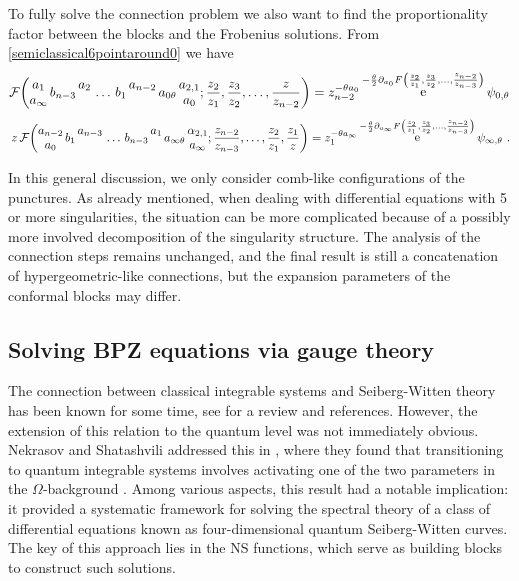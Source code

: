 \documentclass[11pt]{article}
\numberwithin{equation}{section}
\newcommand{\be}{\begin{equation}}
\newcommand{\ee}{\end{equation}}
\DeclareMathOperator{\re}{{\rm e}}
\newcommand{\Fns}[8]{\mathcal{F}\bigg( \begin{matrix} #2 \\ #1 \end{matrix} \, #3 \, \begin{matrix} #4  \\ \, \end{matrix} \,#5 \, #6\,\begin{matrix} #7 \\  \, \end{matrix} \, #8 \, }
\begin{document}
To fully solve the connection problem we also want to find the proportionality factor between the blocks and the Frobenius solutions. From \eqref{semiclassical6pointaround0} we have 
 \be  \Fns{a_{\infty}}{a_{{1}}}{b_{n-3}}{a_{{2}}}{\dots}{b_1}{a_{n-2}}{a_{0\theta}}\begin{matrix} a_{2,1} \\ a_0\end{matrix};\frac{z_{2}}{z_{1}},\frac{z_{3}}{z_{2}},\dots,\frac{z}{z_{n-2}}\bigg) = z_{n-2}^{-\theta a_0}\re^{-{\theta\over 2} \partial_{a_0} F\left(\frac{z_{2}}{z_{1}},\frac{z_{3}}{z_{2}},\dots,\frac{z_{n-2}}{z_{n-3}}\right)}\psi_{0,\theta}
%
\ee
\be \,z\,\Fns{a_{0}}{a_{n-2}}{b_{1}}{a_{{n-3}}}{\dots}{b_{n-3}}{a_{{1}}}{a_{\infty\theta}}\begin{matrix} \alpha_{2,1} \\ a_{\infty}\end{matrix};\frac{z_{n-2}}{z_{n-3}},\dots,\frac{z_{2}}{z_1},\frac{z_{1}}{z}\bigg) =z_{1}^{-\theta a_{\infty}}\re^{-{\theta\over 2} \partial_{a_{\infty}} F\left(\frac{z_{2}}{z_{1}},\frac{z_{3}}{z_{2}},\dots,\frac{z_{n-2}}{z_{n-3}}\right)} \psi_{\infty,\theta}~.\ee
%

In this general discussion, we only consider comb-like  configurations of the punctures. As already mentioned, when dealing with differential equations with 5 or more singularities, the situation can be more complicated because of a possibly more involved decomposition of the singularity structure. The analysis of the connection steps remains unchanged, and the final result is still a concatenation of hypergeometric-like connections, but the expansion parameters of the conformal blocks may differ.
%

\subsection{Solving BPZ equations via gauge theory}\label{sec:gauge}

The connection between classical integrable systems and Seiberg-Witten theory has been known for some time, see \cite{Mbook} for a review and references. However, the extension of this relation to the quantum level was not immediately obvious. Nekrasov and Shatashvili addressed this in \cite{ns}, where they found that transitioning to quantum integrable systems involves activating one of the two parameters in the $\Omega$-background \cite{Moore:1997dj,Lossev:1997bz,no2}. Among various aspects,  this result had a notable implication: it provided a systematic framework for solving the spectral theory of a class of differential equations known as four-dimensional quantum Seiberg-Witten curves. The key of this approach lies in the NS functions, which serve as  building blocks to construct such solutions.
\end{document}
